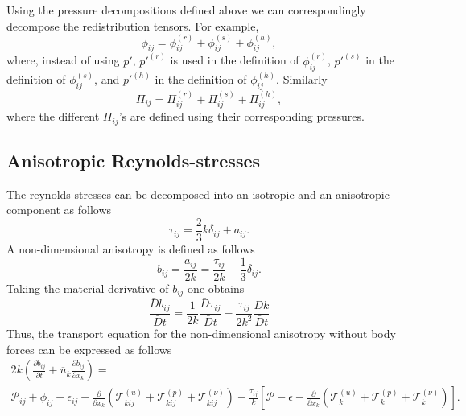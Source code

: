 \documentclass[oneside,a4paper,11pt]{report}
\newcommand{\uavg}{\overline{u}}
\newcommand{\pfluc}{p'}
\newcommand{\rs}{\tau}          %
\newcommand{\ars}{a}            %
\newcommand{\redi}{\phi}        %
\begin{document}
Using the pressure decompositions defined above we can correspondingly decompose the redistribution tensors. For example,
\begin{equation}
\redi_{ij} = \redi_{ij}^{(r)} + \redi_{ij}^{(s)} + \redi_{ij}^{(h)},
\end{equation}
where, instead of using $\pfluc$, $\pfluc^{(r)}$ is used in the definition of $\redi^{(r)}_{ij}$, $\pfluc^{(s)}$ in the definition of $\redi^{(s)}_{ij}$, and $\pfluc^{(h)}$ in the definition of $\redi^{(h)}_{ij}$. Similarly
\begin{equation}
\Pi_{ij} = \Pi^{(r)}_{ij} + \Pi^{(s)}_{ij} + \Pi^{(h)}_{ij},
\end{equation}
where the different $\Pi_{ij}$'s are defined using their corresponding pressures.

\subsection{Anisotropic Reynolds-stresses}

The reynolds stresses can be decomposed into an isotropic and an anisotropic component as follows
\begin{equation}
\rs_{ij} = \frac{2}{3} k \delta_{ij} + \ars_{ij}.
\end{equation}
A non-dimensional anisotropy is defined as follows
\begin{equation}
b_{ij} = \frac{a_{ij}}{2k} = \frac{\rs_{ij}}{2k} - \frac{1}{3} \delta_{ij}.
\end{equation}
Taking the material derivative of $b_{ij}$ one obtains 
\[ \frac{\bar{D} b_{ij}}{\bar{D}t} = \frac{1}{2k} \frac{\bar{D}\rs_{ij} }{\bar{D}t} - \frac{\rs_{ij}}{2k^2} \frac{\bar{D} k}{\bar{D}t} \]
Thus, the transport equation for the non-dimensional anisotropy without body forces can be expressed as follows
\begin{multline}
\label{anisotropy_eq}
2k \left( \frac{\partial b_{ij}}{\partial t} + \uavg_k \frac{\partial b_{ij}}{\partial x_k} \right ) =\\ \mathcal{P}_{ij} + \redi_{ij} - \epsilon_{ij} - \frac{\partial}{\partial x_k} \left ( \mathcal{T}^{(u)}_{kij} + \mathcal{T}^{(p)}_{kij} + \mathcal{T}^{(\nu)}_{kij} \right ) - \frac{\rs_{ij}}{k} \left [ \mathcal{P} - \epsilon - \frac{\partial}{\partial x_k} \left ( \mathcal{T}^{(u)}_{k} + \mathcal{T}^{(p)}_{k} + \mathcal{T}^{(\nu)}_{k} \right ) \right ].
\end{multline}
\end{document}
